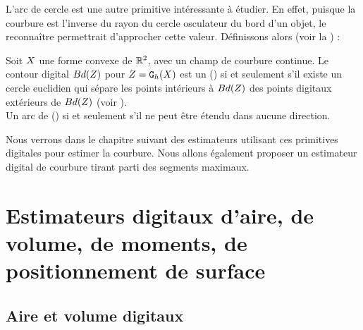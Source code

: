 L'arc de cercle est une autre primitive intéressante à étudier. En effet,
puisque la courbure est l'inverse du rayon du cercle osculateur du bord d'un
objet, le reconnaître permettrait d'approcher cette valeur. Définissons alors
 (voir la ) :
%
\begin{definition}{}
  \label{def:digital-circular-arc}
  Soit $X$ une forme convexe de $\mathbb{R}^2$, avec un champ de courbure continue.
  Le contour digital $Bd({Z})$ pour $Z = \mathtt{G}_{h}(X)$ est un  () si et seulement s'il existe un cercle euclidien
  qui sépare les points intérieurs à $Bd({Z})$ des points digitaux
  extérieurs de $Bd({Z})$ (voir ).
  \\
  Un arc de  () si et seulement s'il ne
  peut être étendu dans aucune direction.
\end{definition}


Nous verrons dans le chapitre suivant des estimateurs utilisant ces primitives
digitales pour estimer la courbure. Nous allons également proposer un estimateur
digital de courbure tirant parti des segments maximaux.
%
\section{Estimateurs digitaux d'aire, de volume, de moments, de positionnement de surface}
%
%
\subsection{Aire et volume digitaux}
%
